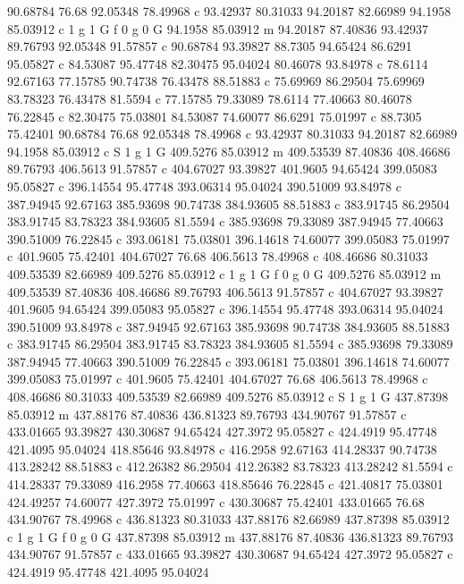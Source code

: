 90.68784 76.68 
92.05348 78.49968 c 
93.42937 80.31033 
94.20187 82.66989 
94.1958 85.03912 c 
1 g 1 G f 
0 g 0 G 
94.1958 85.03912 m 
94.20187 87.40836 
93.42937 89.76793 
92.05348 91.57857 c 
90.68784 93.39827 
88.7305 94.65424 
86.6291 95.05827 c 
84.53087 95.47748 
82.30475 95.04024 
80.46078 93.84978 c 
78.6114 92.67163 
77.15785 90.74738 
76.43478 88.51883 c 
75.69969 86.29504 
75.69969 83.78323 
76.43478 81.5594 c 
77.15785 79.33089 
78.6114 77.40663 
80.46078 76.22845 c 
82.30475 75.03801 
84.53087 74.60077 
86.6291 75.01997 c 
88.7305 75.42401 
90.68784 76.68 
92.05348 78.49968 c 
93.42937 80.31033 
94.20187 82.66989 
94.1958 85.03912 c 
S 
1 g 1 G 
409.5276 85.03912 m 
409.53539 87.40836 
408.46686 89.76793 
406.5613 91.57857 c 
404.67027 93.39827 
401.9605 94.65424 
399.05083 95.05827 c 
396.14554 95.47748 
393.06314 95.04024 
390.51009 93.84978 c 
387.94945 92.67163 
385.93698 90.74738 
384.93605 88.51883 c 
383.91745 86.29504 
383.91745 83.78323 
384.93605 81.5594 c 
385.93698 79.33089 
387.94945 77.40663 
390.51009 76.22845 c 
393.06181 75.03801 
396.14618 74.60077 
399.05083 75.01997 c 
401.9605 75.42401 
404.67027 76.68 
406.5613 78.49968 c 
408.46686 80.31033 
409.53539 82.66989 
409.5276 85.03912 c 
1 g 1 G f 
0 g 0 G 
409.5276 85.03912 m 
409.53539 87.40836 
408.46686 89.76793 
406.5613 91.57857 c 
404.67027 93.39827 
401.9605 94.65424 
399.05083 95.05827 c 
396.14554 95.47748 
393.06314 95.04024 
390.51009 93.84978 c 
387.94945 92.67163 
385.93698 90.74738 
384.93605 88.51883 c 
383.91745 86.29504 
383.91745 83.78323 
384.93605 81.5594 c 
385.93698 79.33089 
387.94945 77.40663 
390.51009 76.22845 c 
393.06181 75.03801 
396.14618 74.60077 
399.05083 75.01997 c 
401.9605 75.42401 
404.67027 76.68 
406.5613 78.49968 c 
408.46686 80.31033 
409.53539 82.66989 
409.5276 85.03912 c 
S 
1 g 1 G 
437.87398 85.03912 m 
437.88176 87.40836 
436.81323 89.76793 
434.90767 91.57857 c 
433.01665 93.39827 
430.30687 94.65424 
427.3972 95.05827 c 
424.4919 95.47748 
421.4095 95.04024 
418.85646 93.84978 c 
416.2958 92.67163 
414.28337 90.74738 
413.28242 88.51883 c 
412.26382 86.29504 
412.26382 83.78323 
413.28242 81.5594 c 
414.28337 79.33089 
416.2958 77.40663 
418.85646 76.22845 c 
421.40817 75.03801 
424.49257 74.60077 
427.3972 75.01997 c 
430.30687 75.42401 
433.01665 76.68 
434.90767 78.49968 c 
436.81323 80.31033 
437.88176 82.66989 
437.87398 85.03912 c 
1 g 1 G f 
0 g 0 G 
437.87398 85.03912 m 
437.88176 87.40836 
436.81323 89.76793 
434.90767 91.57857 c 
433.01665 93.39827 
430.30687 94.65424 
427.3972 95.05827 c 
424.4919 95.47748 
421.4095 95.04024 
